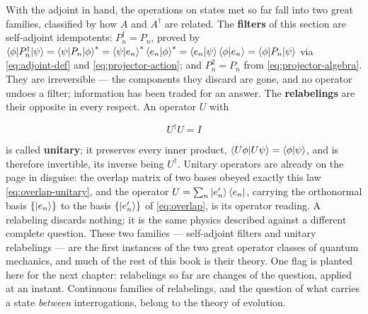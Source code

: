 With the adjoint in hand, the operations on states met so far fall into two great families, classified by how $A$ and $A^\dagger$ are related. The \textbf{filters} of this section are self-adjoint idempotents: $P_n^\dagger = P_n$, proved by $\braket{\phi|P_n^\dagger|\psi} = \braket{\psi|P_n|\phi}^* = \braket{\psi|e_n}^*\braket{e_n|\phi}^* = \braket{e_n|\psi}\braket{\phi|e_n} = \braket{\phi|P_n|\psi}$ via \eqref{eq:adjoint-def} and \eqref{eq:projector-action}; and $P_n^2 = P_n$ from \eqref{eq:projector-algebra}. They are irreversible --- the components they discard are gone, and no operator undoes a filter; information has been traded for an answer. The \textbf{relabelings} are their opposite in every respect. An operator $U$ with
\begin{linenomath}
    \begin{equation}
        U^\dagger U = I
        \label{eq:unitary-def}
    \end{equation}
\end{linenomath}
is called \textbf{unitary}; it preserves every inner product, $\braket{U\phi|U\psi} = \braket{\phi|\psi}$, and is therefore invertible, its inverse being $U^\dagger$. Unitary operators are already on the page in disguise: the overlap matrix of two bases obeyed exactly this law \eqref{eq:overlap-unitary}, and the operator $U = \sum_n\ket{e'_n}\bra{e_n}$, carrying the orthonormal basis $\{\ket{e_n}\}$ to the basis $\{\ket{e'_n}\}$ of \eqref{eq:overlap}, is its operator reading. A relabeling discards nothing; it is the same physics described against a different complete question. These two families --- self-adjoint filters and unitary relabelings --- are the first instances of the two great operator classes of quantum mechanics, and much of the rest of this book is their theory. One flag is planted here for the next chapter: relabelings so far are changes of the question, applied at an instant. Continuous families of relabelings, and the question of what carries a state \emph{between} interrogations, belong to the theory of evolution.

